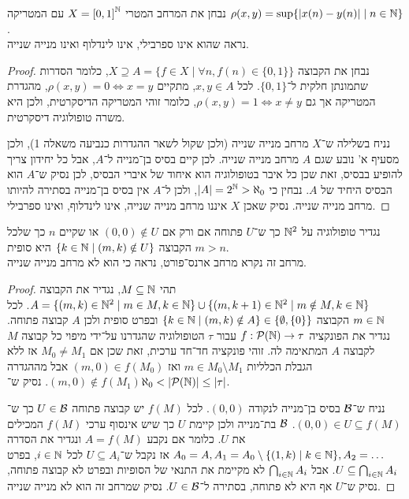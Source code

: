 \subquestion{}
נבחן את המרחב המטרי $X = {[0, 1]}^{\mathbb{N}}$ עם המטריקה $\rho(x, y) = \sup \{ |x(n) - y(n)| \mid n \in \mathbb{N} \}$. \\
נראה שהוא אינו ספרבילי, אינו לינדלוף ואינו מנייה שנייה.
\begin{proof}
	נבחן את הקבוצה $X \supseteq A = \{ f \in X \mid \forall n, f(n) \in \{0, 1\} \}$, כלומר הסדרות שתמונתן חלקית ל־$\{0, 1\}$.
	לכל $x, y \in A$, מתקיים $\rho(x, y) = 0 \iff x = y$, מהגדרת המטריקה אך גם $\rho(x, y) = 1 \iff x \ne y$, כלומר זוהי המטריקה הדיסקרטית, ולכן היא משרה טופולוגיה דיסקרטית.

	נניח בשלילה ש־$X$ מרחב מנייה שנייה (ולכן שקול לשאר ההגדרות כנביעה משאלה 1), ולכן מסעיף א' נובע שגם $A$ מרחב מנייה שנייה.
	לכן קיים בסיס בן־מנייה ל־$A$, אבל כל יחידון צריך להופיע בבסיס, זאת שכן כל איבר בטופולוגיה הוא איחוד של איברי הבסיס, לכן נסיק ש־$A$ הוא הבסיס היחיד של $A$.
	נבחין כי $|A| = 2^{\mathbb{N}} > \aleph_0$, ולכן ל־$A$ אין בסיס בן־מנייה בסתירה להיותו מרחב מנייה שנייה.
	נסיק שאכן $X$ איננו מרחב מנייה שנייה, אינו לינדלוף, ואינו ספרבילי.
\end{proof}

\question{}
נגדיר טופולוגיה על $\mathbb{N}^2$ כך ש־$U$ פתוחה אם ורק אם $(0, 0) \notin U$ או שקיים $n$ כך שלכל $m > n$ הקבוצה $\{ k \in \mathbb{N} \mid (m, k) \notin U \}$ היא סופית. \\
מרחב זה נקרא מרחב ארנס־פורט, נראה כי הוא לא מרחב מנייה שנייה.
\begin{proof}
	תהי $M \subseteq \mathbb{N}$, נגדיר את הקבוצה $A = \{ (m, k) \in \mathbb{N}^2 \mid m \in M, k \in \mathbb{N} \} \cup \{ (m, k + 1) \in \mathbb{N}^2 \mid m \notin M, k \in \mathbb{N} \}$.
	לכל $m \in \mathbb{N}$ הקבוצה $\{ k \in \mathbb{N} \mid (m, k) \notin A \} \in \{ \emptyset, \{ 0 \} \}$ ובפרט סופית ולכן $A$ קבוצה פתוחה.
	נגדיר את הפונקציה $f : \mathcal{P}(\mathbb{N}) \to \tau$ עבור $\tau$ הטופולוגיה שהגדרנו על־ידי מיפוי כל קבוצה $M$ לקבוצה $A$ המתאימה לה.
	זוהי פונקציה חד־חד ערכית, זאת שכן אם $M_0 \ne M_1$ אז ללא הגבלת הכלליות $m \in M_0 \setminus M_1$ ואז $(m, 0) \in f(M_0)$ אבל מההגדרה $(m, 0) \notin f(M_1)$.
	נסיק ש־$\aleph_0 < |\mathcal{P}(\mathbb{N})| \le |\tau|$.

	נניח ש־$\mathcal{B}$ בסיס בן־מנייה לנקודה $(0, 0)$.
	לכל $f(M)$ יש קבוצה פתוחה $U \in \mathcal{B}$ כך ש־$(0, 0) \in U \subseteq f(M)$.
	$\mathcal{B}$ בת־מנייה ולכן קיימת $U$ כך שיש אינסוף ערכי $f(M)$ המכילים את $U$.
	כלומר אם נקבע $A = f(M)$ ונגדיר את הסדרה $A_0 = A, A_1 = A_0 \setminus \{ (1, k) \mid k \in \mathbb{N} \}, A_2 = \ldots$ אז נקבל ש־$U \subseteq A_i$ לכל $i \in \mathbb{N}$, בפרט $U \subseteq \bigcap_{i \in \mathbb{N}} A_i$.
	אבל $\bigcap_{i \in \mathbb{N}} A_i$ לא מקיימת את התנאי של הסופיות ובפרט לא קבוצה פתוחה, נסיק ש־$U$ אף היא לא פתוחה, בסתירה ל־$U \in \mathcal{B}$.
	נסיק שמרחב זה הוא לא מנייה שנייה.
\end{proof}

